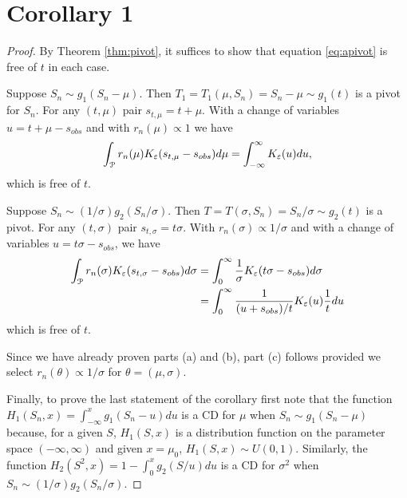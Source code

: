 \section{Corollary 1} 
\begin{proof} By Theorem \ref{thm:pivot}, it suffices to show that equation \ref{eq:apivot} is free of $t$ in each case.

 Suppose %
$S_n \sim g_1(S_n - \mu)$. Then $T_1 = T_1(\mu, S_n) = S_n - \mu \sim g_1(t)$ is a pivot for $S_n$. For any $(t, \mu)$ pair $s_{t,\mu}=t + \mu$.  With a change of variables $u = t + \mu - s_{obs}$ and with $r_n(\mu)\propto 1$ we have%
	\begin{align*}
	\int_{\cal{P}} r_n(\mu)K_{\varepsilon}(s_{t, \mu} - s_{\relax obs}) d\mu =  \int_{-\infty}^{\infty} K_{\varepsilon}(u) du,
	\end{align*}
which is free of $t$.
	
 Suppose $S_n  \sim (1/\sigma) g_2(S_n / \sigma)$. Then $T = T(\sigma, S_n ) = S_n  / \sigma \sim g_2(t)$ is a pivot. For any $(t, \sigma)$ pair $s_{t,\sigma}= t\sigma$. With $r_n(\sigma) \propto 1/\sigma$ and with a change of variables $u = t\sigma - s_{obs}$, we have 
	\begin{align*}
	\int_{\cal{P}} r_n(\sigma) K_{\varepsilon}(s_{t,\sigma} - s_{\relax obs}) d\sigma &=
	\int_{0}^{\infty} \frac{1}{\sigma} K_{\varepsilon}(t\sigma - s_{\relax obs}) d\sigma \\
	&= \int_{0}^{\infty} \frac{1}{(u + s_{obs})/t}K_{\varepsilon}(u) \frac{1}{t} du 
	\end{align*}
	which is free of $t$.
	
 Since we have already proven parts (a) and (b), part (c) follows provided we select $r_{n}(\theta) \propto 1/\sigma$ for $\theta = (\mu, \sigma)$. 
	
Finally, to prove the last statement of the corollary first note that the function $ H_1(S_n, x) = \int_{-\infty}^{x}g_1(S_n-u)du $ is a CD for $\mu$ when $S_n \sim g_1(S_n - \mu)$ because, for a given $S$, $H_1(S, x) $ is a distribution function on the parameter space $(-\infty, \infty)$ and given $x = \mu_0$, $H_1(S, x) \sim U(0,1)$. Similarly, the function $H_2(S^2,x) = 1 - \int_{0}^{x} g_2(S/u)du$ is a CD for $\sigma^2$ when $S_n \sim (1/\sigma)g_2(S_n/\sigma)$.  
\end{proof}

